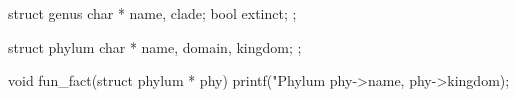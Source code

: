 struct genus {
  char * name, clade;
  bool extinct;
};

struct phylum {
  char * name, domain, kingdom;
};

void fun_fact(struct phylum * phy) {
  printf("Phylum %
    phy->name,
    phy->kingdom);
}